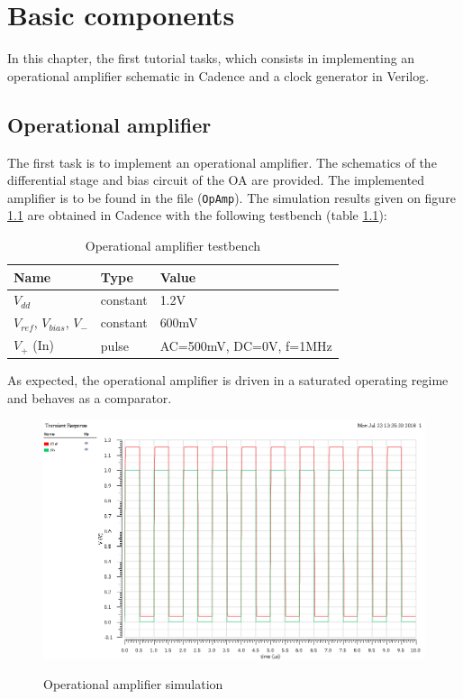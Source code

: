 \chapter{Basic components}

In this chapter, the first tutorial tasks, which consists in implementing an operational amplifier schematic in Cadence and a clock generator in Verilog. 

\section{Operational amplifier}

The first task is to implement an operational amplifier. The schematics of the differential stage and bias circuit of the OA are provided. The implemented amplifier is to be found in the file (\texttt{OpAmp}). The simulation results given on figure \ref{fig:opAmpSimulation} are obtained in Cadence with the following testbench (table \ref{table:opAmpTestbench}): 

\begin{table}[!h]
	\centering
	\begin{tabular}{|l|l|l|}
		\hline
		Name & Type & Value \\
		\hline
		$V_{dd}$ & constant & 1.2V \\
		$V_{ref}$, $V_{bias}$, $V_{-}$ & constant & 600mV \\
		$V_{+}$ (In) & pulse & AC=500mV, DC=0V, f=1MHz \\
		\hline
	\end{tabular}
	\label{table:opAmpTestbench}
	\caption{Operational amplifier testbench}
\end{table}

As expected, the operational amplifier is driven in a saturated operating regime and behaves as a comparator.

\begin{figure}[h]
	\centering
	\includegraphics[scale=0.65]{images/BasicComponents/Task1opAmpSimulation.png}
	\label{fig:opAmpSimulation}
	\caption{Operational amplifier simulation}
\end{figure} 

